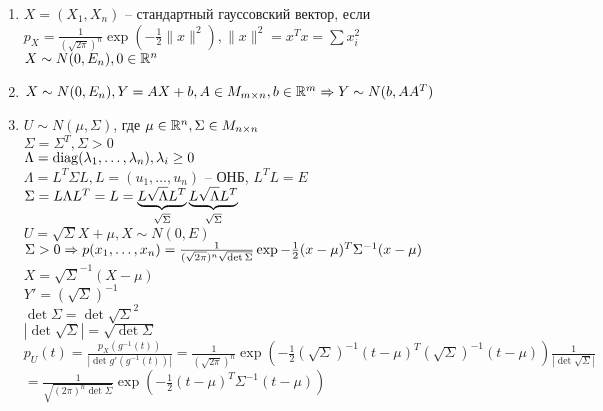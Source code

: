 \documentclass[12pt]{article}
\begin{document}
\begin{enumerate}
    \item $X = (X_1, X_n)$ -- стандартный гауссовский вектор, если $p_X = \frac1{(\sqrt{2\pi})^n} \exp(-\frac12 \|x\|^2), \|x\|^2 = x^Tx = \sum x_i^2$\\
    $X \sim N(0, E_n), 0 \in \mathbb{R}^n$
    \item $X \sim N(0, E_n), Y = AX + b, A \in M_{m\times n}, b \in \mathbb{R}^m \Rightarrow Y \sim N(b, AA^T)$
    \item $U \sim N(\mu, \Sigma)$, где $\mu \in \mathbb{R}^n, \Sigma \in M_{n\times n}$\\
    $\Sigma = \Sigma^T, \Sigma > 0$\\
    $\Lambda = \operatorname{diag}(\lambda_1, \ldots, \lambda_n), \lambda_i \geq 0$\\
    $\Lambda = L^T \Sigma L, L = (u_1, \ldots, u_n)$ -- ОНБ, $L^TL = E$\\
    $\Sigma = L\Lambda L^T = L = \underbrace{L \sqrt{\Lambda} L^T}_{\sqrt{\Sigma}} \underbrace{L \sqrt{\Lambda}L^T}_{\sqrt{\Sigma}}$\\
    $U = \sqrt{\Sigma}X + \mu, X \sim N(0, E)$\\
    $\Sigma > 0 \Rightarrow p(x_1, \ldots, x_n) = \frac1{(\sqrt{2\pi})^n \sqrt{\det \Sigma}} \exp{-\frac12 (x-\mu)^T \Sigma^{-1} (x-\mu)}$\\
    $X=\sqrt{\Sigma}^{-1}(X-\mu)$\\
    $Y' = (\sqrt{\Sigma})^{-1}$\\
    $\det \Sigma = \det \sqrt{\Sigma}^2$\\
    $|\det \sqrt{\Sigma}| = \sqrt{\det \Sigma}$\\
    $p_U(t) = \frac{p_X(g^{-1}(t))}{|\det g'(g^{-1}(t))|} = \frac{1}{(\sqrt{2\pi})^n} \exp(-\frac12 (\sqrt{\Sigma})^{-1}(t-\mu)^T(\sqrt{\Sigma})^{-1}(t-\mu)) \frac{1}{|\det \sqrt{\Sigma}|}$\\
    $= \frac1{\sqrt{(2\pi)^n \det \Sigma}}\exp(-\frac12 (t-\mu)^T \Sigma^{-1} (t-\mu))$
\end{enumerate}
\end{document}
